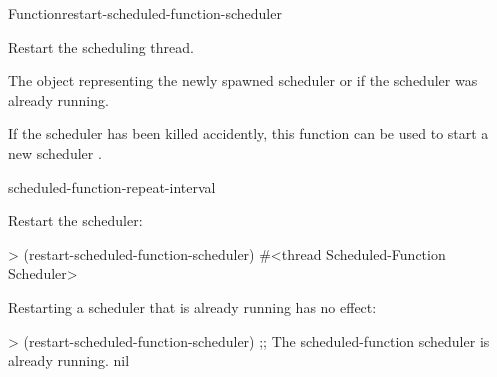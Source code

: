 \documentclass[10pt,twoside,english,pdftex]{article}
\begin{document}

\begin{functiondoc}{Function}{restart-scheduled-function-scheduler}%
  {\noargs{} \returns{} }
%

\fnsyntax

\fnpurpose Restart the  scheduling thread.

\fnpackage {}

\fnmodule {}

\fnreturns The object representing the newly spawned
 scheduler  or \nil{} if the
 scheduler was already running.

\fnerrors
\nothreads{}

\fndescription If the  scheduler  has
been killed accidently, this function can be used to start a new scheduler
.

\begin{alsos}{scheduled-function-repeat-interval}
\end{alsos}

\fnexamples
Restart the  scheduler:
\begin{example}
> (restart-scheduled-function-scheduler)
#<thread Scheduled-Function Scheduler>
\end{example}

Restarting a  scheduler that is already running has
no effect:
\begin{example}
> (restart-scheduled-function-scheduler)
;; The scheduled-function scheduler is already running.
nil
\end{example}

\end{functiondoc}

\end{document}

